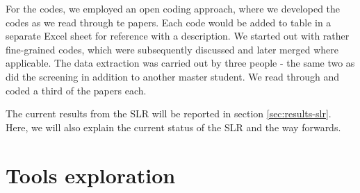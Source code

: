 For the codes, we employed an open coding approach, where we developed the codes as we read through te papers. Each code would be added to table in a separate Excel sheet for reference with a description. We started out with rather fine-grained codes, which were subsequently discussed and later merged where applicable. The data extraction was carried out by three people - the same two as did the screening in addition to another master student. We read through and coded a third of the papers each.

The current results from the SLR will be reported in section \ref{sec:results-slr}. Here, we will also explain the current status of the SLR and the way forwards.

\section{Tools exploration}

